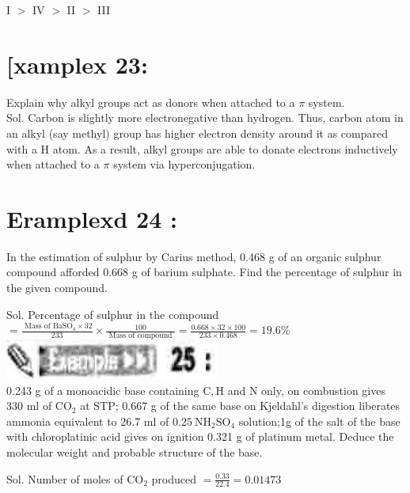 \documentclass[10pt]{article}
\begin{document}
I $>$ IV $>$ II $>$ III

\section*{[xamplex 23:}
Explain why alkyl groups act as donors when attached to a $\pi$ system.\\
Sol. Carbon is slightly more electronegative than hydrogen. Thus, carbon atom in an alkyl (say methyl) group has higher electron density around it as compared with a H atom. As a result, alkyl groups are able to donate electrons inductively when attached to a $\pi$ system via hyperconjugation.

\section*{Eramplexd 24 :}
In the estimation of sulphur by Carius method, 0.468 g of an organic sulphur compound afforded 0.668 g of barium sulphate. Find the percentage of sulphur in the given compound.

Sol. Percentage of sulphur in the compound $=\frac{\text { Mass of } \mathrm{BaSO}_{4} \times 32}{233} \times \frac{100}{\text { Mass of compound }}=\frac{0.668 \times 32 \times 100}{233 \times 0.468}=19.6 \%$\\
\includegraphics[max width=\textwidth, center]{2025_01_28_8470952b98110cec3aabg-123(2)}\\
0.243 g of a monoacidic base containing $\mathrm{C}, \mathrm{H}$ and N only, on combustion gives 330 ml of $\mathrm{CO}_{2}$ at STP; 0.667 g of the same base on Kjeldahl's digestion liberates ammonia equivalent to 26.7 ml of $0.25 \mathrm{~N} \mathrm{H}_{2} \mathrm{SO}_{4}$ solution;1g of the salt of the base with chloroplatinic acid gives on ignition 0.321 g of platinum metal. Deduce the molecular weight and probable structure of the base.

Sol. Number of moles of $\mathrm{CO}_{2}$ produced $=\frac{0.33}{22.4}=0.01473$
\end{document}
